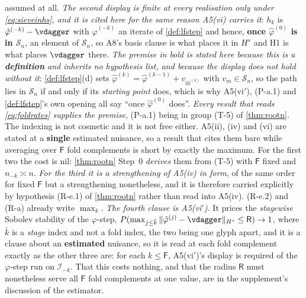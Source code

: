 \begin{definition}
\begin{enumerate}
{assumed at all}. \emph{The second display is finite at every realisation only under
\eqref{eq:sieveinhs}, and it is cited here for the same reason A5(vi) carries it}: $h_k$ is
$\hat\varphi^{(-k)}-\vdagger$ with $\hat\varphi^{(-k)}$ an iterate of \cref{def:lfstep} and hence, 
\textbf{once $\hat\varphi^{(0)}$ is in $\mathcal S_n$}, an
element of $\mathcal S_n$, so A8's basis clause is what places it in $H^{s}$ and H1 is what places
$\vdagger$ there.
\emph{The premise in bold is stated here because this is a \textbf{definition} and inherits no hypothesis
list, and because the display does not hold without it}: \cref{def:lfstep}\textup{(d)} sets
$\hat\varphi^{(k)}=\hat\varphi^{(k-1)}+v_{\hat m^{(k)}}$ with $v_m\in\mathcal S_n$, so the path lies in
$\mathcal S_n$ if and only if its \emph{starting point} does, which is why A5(vi$'$), (P-a.1) and
\cref{def:lfstep}'s own opening all say ``once $\hat\varphi^{(0)}$ does''.
\emph{Every result that reads \eqref{eq:foldrates} supplies the premise},
(P-a.1) being in group (T-5) of \cref{thm:rootn}.
The indexing is not cosmetic
and it is not free either. A5(ii), (iv) and (vi) are stated at a \textbf{single} estimated nuisance, so a
result that cites them bare while averaging over $\mathsf F$ fold complements is short by exactly the
maximum. For the first two the cost is nil: \cref{thm:rootn} Step~0 \emph{derives} them from (T-5) with
$\mathsf F$ fixed and $n_{-k}\asymp n$. \emph{For the third it is a strengthening of A5(iv) in form},
of the same order for fixed $\mathsf F$ but a strengthening nonetheless, and it is therefore carried
explicitly by hypothesis (R-e.1) of \cref{thm:rootn} rather than read into A5(iv). (R-e.2) and (R-a)
already write $\max_{k}$.
\emph{The fourth clause is A5(vi$'$).} It prices the \emph{stagewise} Sobolev stability of the
$\varphi$-step,
$P(\max_{j\le\bar k}\|\hat\varphi^{(j)}-\vdagger\|_{H^{s}}\le\mathsf R)\to1$, where $\bar k$ is a
\emph{stage} index and not a fold index, the two being one glyph apart, and it is a clause about an
\textbf{estimated} nuisance, so it is read at each fold complement exactly as the other three are: for each
$k\le\mathsf F$, A5(vi$'$)'s display is required of the $\varphi$-step run on $\mathcal I_{-k}$.
That this costs nothing, and that the radius $\mathsf R$ must nonetheless serve all $\mathsf F$ fold
complements at one value, are in the supplement's discussion of the estimator.

\end{enumerate}
\end{definition}
